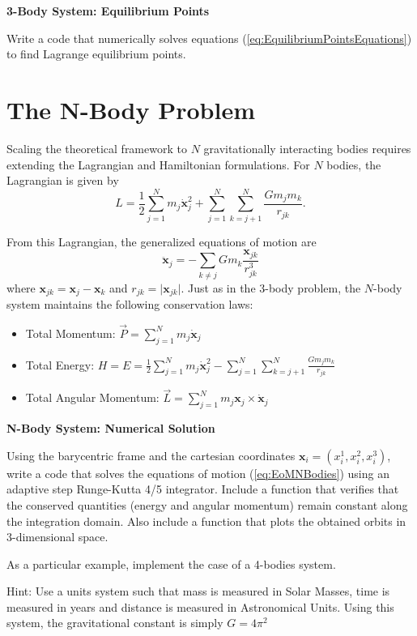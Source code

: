 \begin{exercise}
 \textbf{3-Body System: Equilibrium Points}
 
 Write a code that numerically solves equations (\ref{eq:EquilibriumPointsEquations}) to find Lagrange equilibrium points.
\end{exercise}

\section{The N-Body Problem}

Scaling the theoretical framework to $N$ gravitationally interacting bodies requires extending the Lagrangian and Hamiltonian formulations. For $N$ bodies, the Lagrangian is given by
\begin{equation}
    L=\frac{1}{2}\sum_{j=1}^{N}m_{j}\dot{\textbf{x}}_{j}^{2}+\sum_{j=1}^{N}\sum_{k=j+1}^{N}\frac{Gm_{j}m_{k}}{r_{jk}}.
\end{equation}

From this Lagrangian, the generalized equations of motion are
\begin{equation}
    \ddot{\textbf{x}}_{j}=-\sum_{k\ne j}Gm_{k}\frac{\textbf{x}_{jk}}{r_{jk}^{3}}\label{eq:EoMNBodies}
\end{equation}
where $\textbf{x}_{jk} = \textbf{x}_j - \textbf{x}_k$ and $r_{jk} = \vert{}\textbf{x}_{jk}\vert{}$. Just as in the 3-body problem, the $N$-body system maintains the following conservation laws:
\begin{itemize}
    \item Total Momentum: $\vec{P}=\sum_{j=1}^{N}m_{j}\dot{\textbf{x}}_{j}$
    \item Total Energy: $H=E=\frac{1}{2}\sum_{j=1}^{N}m_{j}\dot{\textbf{x}}_{j}^{2}-\sum_{j=1}^{N}\sum_{k=j+1}^{N}\frac{Gm_{j}m_{k}}{r_{jk}}$
    \item Total Angular Momentum: $\vec{L}=\sum_{j=1}^{N}m_{j}\textbf{x}_{j}\times\dot{\textbf{x}}_{j}$
\end{itemize}

\begin{exercise}
 \textbf{N-Body System: Numerical Solution}
 
 Using the barycentric frame and the cartesian coordinates $\textbf{x}_i = (x^1_i, x^2_i, x^3_i)$, write a code that solves the equations of motion (\ref{eq:EoMNBodies}) using an adaptive step Runge-Kutta 4/5 integrator. Include a function that verifies that the conserved quantities (energy and angular momentum) remain constant along the integration domain. Also include a function that plots the obtained orbits in 3-dimensional space.

 As a particular example, implement the case of a 4-bodies system.

Hint: Use a units system such that mass is measured in Solar Masses, time is measured in years and distance is measured in Astronomical Units. Using this system, the gravitational constant is simply $G=4\pi^2$
\end{exercise}